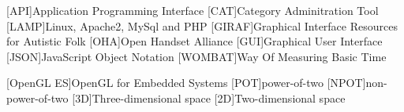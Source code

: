 [API]{Application Programming Interface}
[CAT]{Category Adminitration Tool}
[LAMP]{Linux, Apache2, MySql and PHP}
[GIRAF]{Graphical Interface Resources for Autistic Folk}
[OHA]{Open Handset Alliance}
[GUI]{Graphical User Interface}
[JSON]{JavaScript Object Notation}
[WOMBAT]{Way Of Measuring Basic Time}

[OpenGL ES]{OpenGL for Embedded Systems}
[POT]{power-of-two}
[NPOT]{non-power-of-two}
[3D]{Three-dimensional space}
[2D]{Two-dimensional space}
